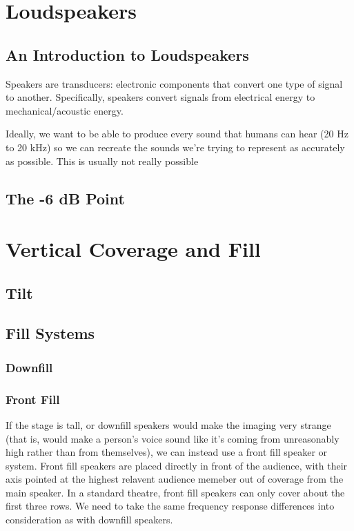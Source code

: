 \documentclass[a4paper]{article}
\begin{document}
\section{Loudspeakers}
\subsection{An Introduction to Loudspeakers}
Speakers are transducers: electronic components that convert one type of signal
to another. Specifically, speakers convert signals from electrical energy to
mechanical/acoustic energy.

Ideally, we want to be able to produce every sound that humans can hear (20 Hz
to 20 kHz) so we can recreate the sounds we're trying to represent as
accurately as possible. This is usually not really possible

\subsection{The -6 dB Point}

\section{Vertical Coverage and Fill}

\subsection{Tilt}

\subsection{Fill Systems}
\subsubsection{Downfill}

\subsubsection{Front Fill}
If the stage is tall, or downfill speakers would make the imaging very strange
(that is, would make a person's voice sound like it's coming from unreasonably
high rather than from themselves), we can instead use a front fill speaker or
system. Front fill speakers are placed directly in front of the audience, with
their axis pointed at the highest relavent audience memeber out of coverage
from the main speaker. In a standard theatre, front fill speakers can only
cover about the first three rows. We need to take the same frequency response
differences into consideration as with downfill speakers.
\end{document}

